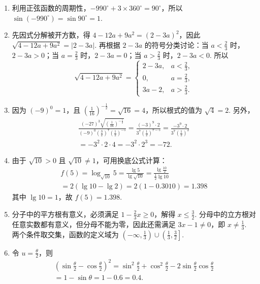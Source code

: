 \begin{solution}
\begin{enumerate}
\item 利用正弦函数的周期性，\(-990^\circ+3\times360^\circ=90^\circ\)，所以
\(\sin\left(-990^\circ\right)=\sin90^\circ=1\).

\item 先因式分解被开方数，得
\(4-12a+9a^2=\left(2-3a\right)^2\)，因此
\(\sqrt{4-12a+9a^2}=\left|2-3a\right|\).
再根据 \(2-3a\) 的符号分类讨论：当 \(a<\frac{2}{3}\) 时，\(2-3a>0\)；当 \(a=\frac{2}{3}\) 时，\(2-3a=0\)；当 \(a>\frac{2}{3}\) 时，\(2-3a<0\). 所以
\[
\sqrt{4-12a+9a^2}=
\begin{cases}
2-3a, & a<\frac{2}{3},\\
0, & a=\frac{2}{3},\\
3a-2, & a>\frac{2}{3}.
\end{cases}
\]

\item 因为 \((-9)^0=1\)，且
\(\left(\frac{1}{16}\right)^{-\frac{1}{2}}=\sqrt{16}=4\)，所以根式的值为 \(\sqrt{4}=2\). 另外，
\[
\begin{gathered}
\frac{(-27)^3\sqrt{\left(\frac{1}{16}\right)^{-\frac{1}{2}}}}{(-9)^0\left(\frac{3}{2}\right)^7\left(\frac{1}{2}\right)^{-5}}
=\frac{(-3)^9\cdot2}{3^7\left(\frac{1}{2}\right)^{7-5}}
=\frac{-3^9\cdot2}{3^7\left(\frac{1}{2}\right)^2}\\
=-3^2\cdot2\cdot4=-3^2\cdot2^3=-72.
\end{gathered}
\]

\item 由于 \(\sqrt{10}>0\) 且 \(\sqrt{10}\ne1\)，可用换底公式计算：
\[
\begin{gathered}
f\left(5\right)=\log_{\sqrt{10}}5
=\frac{\lg5}{\lg\sqrt{10}}
=\frac{\lg\frac{10}{2}}{\frac{1}{2}\lg10}\\
=2\left(\lg10-\lg2\right)
=2\left(1-0.3010\right)
=1.398
\end{gathered}
\]
其中 \(\lg10=1\)，故 \(f\left(5\right)=1.398\).

\item 分子中的平方根有意义，必须满足 \(1-\frac{2}{3}x\ge0\)，解得 \(x\le\frac{3}{2}\). 分母中的立方根对任意实数都有意义，但分母不能为零，因此还需满足 \(3x-1\ne0\)，即 \(x\ne\frac{1}{3}\). 两个条件取交集，函数的定义域为
\(\left(-\infty,\frac{1}{3}\right)\cup\left(\frac{1}{3},\frac{3}{2}\right]\).

\item 令 \(u=\frac{\theta}{2}\)，则
\[
\begin{gathered}
\left(\sin\frac{\theta}{2}-\cos\frac{\theta}{2}\right)^2
=\sin^2\frac{\theta}{2}+\cos^2\frac{\theta}{2}-2\sin\frac{\theta}{2}\cos\frac{\theta}{2}\\
=1-\sin\theta=1-0.6=0.4.
\end{gathered}
\]
\end{enumerate}
\end{solution}

